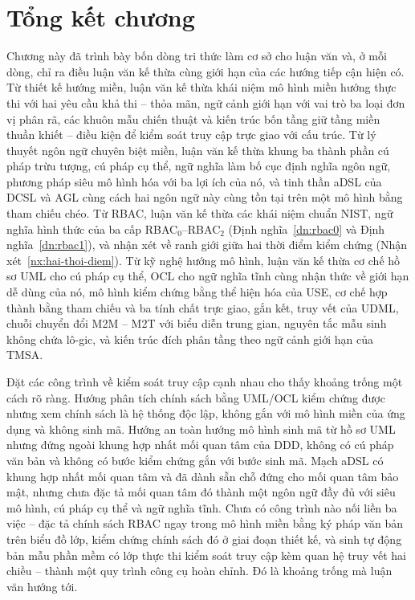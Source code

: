 \section{Tổng kết chương}
\label{sec:tong-ket-c2}

Chương này đã trình bày bốn dòng tri thức làm cơ sở cho luận văn và, ở mỗi dòng, chỉ ra điều luận văn kế thừa cùng giới hạn của các hướng tiếp cận hiện có. Từ thiết kế hướng miền, luận văn kế thừa khái niệm mô hình miền hướng thực thi với hai yêu cầu khả thi -- thỏa mãn, ngữ cảnh giới hạn với vai trò ba loại đơn vị phân rã, các khuôn mẫu chiến thuật và kiến trúc bốn tầng giữ tầng miền thuần khiết -- điều kiện để kiểm soát truy cập trực giao với cấu trúc. Từ lý thuyết ngôn ngữ chuyên biệt miền, luận văn kế thừa khung ba thành phần cú pháp trừu tượng, cú pháp cụ thể, ngữ nghĩa làm bố cục định nghĩa ngôn ngữ, phương pháp siêu mô hình hóa với ba lợi ích của nó, và tinh thần aDSL của DCSL và AGL cùng cách hai ngôn ngữ này cùng tồn tại trên một mô hình bằng tham chiếu chéo. Từ RBAC, luận văn kế thừa các khái niệm chuẩn NIST, ngữ nghĩa hình thức của ba cấp RBAC$_0$--RBAC$_2$ (Định nghĩa~\ref{dn:rbac0} và Định nghĩa~\ref{dn:rbac1}), và nhận xét về ranh giới giữa hai thời điểm kiểm chứng (Nhận xét~\ref{nx:hai-thoi-diem}). Từ kỹ nghệ hướng mô hình, luận văn kế thừa cơ chế hồ sơ UML cho cú pháp cụ thể, OCL cho ngữ nghĩa tĩnh cùng nhận thức về giới hạn dễ dùng của nó, mô hình kiểm chứng bằng thể hiện hóa của USE, cơ chế hợp thành bằng tham chiếu và ba tính chất trực giao, gắn kết, truy vết của UDML, chuỗi chuyển đổi M2M -- M2T với biểu diễn trung gian, nguyên tắc mẫu sinh không chứa lô-gic, và kiến trúc đích phân tầng theo ngữ cảnh giới hạn của TMSA.

Đặt các công trình về kiểm soát truy cập cạnh nhau cho thấy khoảng trống một cách rõ ràng. Hướng phân tích chính sách bằng UML/OCL kiểm chứng được nhưng xem chính sách là hệ thống độc lập, không gắn với mô hình miền của ứng dụng và không sinh mã. Hướng an toàn hướng mô hình sinh mã từ hồ sơ UML nhưng đứng ngoài khung hợp nhất mối quan tâm của DDD, không có cú pháp văn bản và không có bước kiểm chứng gắn với bước sinh mã. Mạch aDSL có khung hợp nhất mối quan tâm và đã dành sẵn chỗ đứng cho mối quan tâm bảo mật, nhưng chưa đặc tả mối quan tâm đó thành một ngôn ngữ đầy đủ với siêu mô hình, cú pháp cụ thể và ngữ nghĩa tĩnh. Chưa có công trình nào nối liền ba việc -- đặc tả chính sách RBAC ngay trong mô hình miền bằng ký pháp văn bản trên biểu đồ lớp, kiểm chứng chính sách đó ở giai đoạn thiết kế, và sinh tự động bản mẫu phần mềm có lớp thực thi kiểm soát truy cập kèm quan hệ truy vết hai chiều -- thành một quy trình công cụ hoàn chỉnh. Đó là khoảng trống mà luận văn hướng tới.
